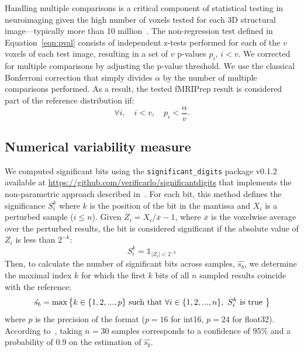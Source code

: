 \documentclass{article}
\newcommand{\fmriprep}{fMRIPrep \xspace}
\begin{document}
Handling multiple comparisons is a critical component of statistical testing in
neuroimaging given the high number of voxels tested for each 3D structural
image---typically more than 10 million~\cite{NICHOLS2007246}. The non-regression
test defined in Equation~\ref{eqn:pval} consists of independent z-tests performed
for each of the $v$ voxels of each test image, resulting in a set of $v$
p-values $p_i$, $i < v$. We corrected for multiple comparisons by adjusting the p-value
threshold. We use the classical Bonferroni correction that simply divides
$\alpha$ by the number of multiple comparisons performed. As a result, the
tested \fmriprep result is considered part of the reference distribution iif:
\begin{equation}
    \label{eq:bonferroni}
    \forall i, \quad i < v, \quad p_i < \frac{\alpha}{v}.
\end{equation}



\subsection*{Numerical variability measure}

We computed significant bits using the \texttt{significant\_digits} package
v0.1.2 available at \url{https://github.com/verificarlo/significantdigits} that
implements the non-parametric approach described in~\cite{sohier2021confidence}.
For each bit, this method defines the significance $S^k_i$ where \(k\) is the
position of the bit in the mantissa and $X_i$ is a perturbed sample  ($i \leq
    n$). Given $Z_i=X_i/\overline{x}-1$, where $\overline{x}$ is the voxelwise average
over the perturbed results, the bit is considered significant if the absolute value of $Z_i$ is less
than $2^{-k}$:
\[S^k_i = \mathds{1}_{|Z_i |<2^{-k}}\] Then, to calculate the number of
significant bits across samples, $\hat{s_b}$, we determine the maximal index
\(k\) for which the first \(k\) bits of all \(n\) sampled results coincide with
the reference:
\[\hat{s_{b}} = \textnormal{max} \left\{ k \in \{1,2,...,p\} \textnormal{ such
        that } \forall i \in \{1,2,...,n\},\  S^{k}_{i} \textnormal{ is true } \right\} \]
where $p$ is the precision of the format ($p=16$ for int16, $p=24$ for float32).
According to~\cite{sohier2021confidence}, taking $n=30$ samples
corresponds to a confidence of 95\% and a probability of 0.9 on the estimation of $\hat{s_b}$.
\end{document}
